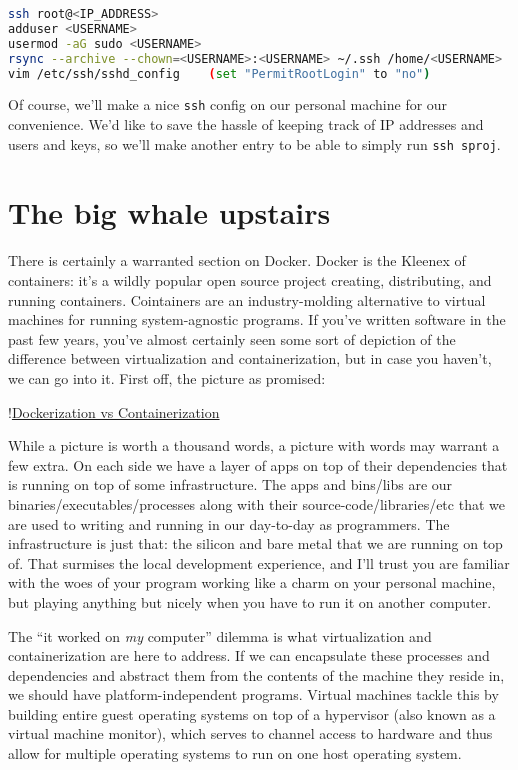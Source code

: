 \documentclass[11pt, twoside, reqno]{book}
\begin{document}
\begin{lstlisting}[language=sh]
ssh root@<IP_ADDRESS>
adduser <USERNAME>
usermod -aG sudo <USERNAME> 
rsync --archive --chown=<USERNAME>:<USERNAME> ~/.ssh /home/<USERNAME> 
vim /etc/ssh/sshd_config    (set "PermitRootLogin" to "no")
\end{lstlisting}

Of course, we'll make a nice \texttt{ssh} config on our personal machine for our convenience. We'd like to save the hassle of keeping track of IP addresses and users and keys, so we'll make another entry to be able to simply run \texttt{ssh sproj}.

\section{The big whale upstairs}

There is certainly a warranted section on Docker. Docker is the Kleenex of containers: it's a wildly popular open source project creating, distributing, and running containers. Cointainers are an industry-molding alternative to virtual machines for running system-agnostic programs. If you've written software in the past few years, you've almost certainly seen some sort of depiction of the difference between virtualization and containerization, but in case you haven't, we can go into it. First off, the picture as promised:

!\href{https://blog.netapp.com/wp-content/uploads/2016/03/Screen-Shot-2018-03-20-at-9.24.09-AM-1024x548.png}{Dockerization vs Containerization}

While a picture is worth a thousand words, a picture with words may warrant a few extra. On each side we have a layer of apps on top of their dependencies that is running on top of some infrastructure. The apps and bins/libs are our binaries/executables/processes along with their source-code/libraries/etc that we are used to writing and running in our day-to-day as programmers. The infrastructure is just that: the silicon and bare metal that we are running on top of. That surmises the local development experience, and I'll trust you are familiar with the woes of your program working like a charm on your personal machine, but playing anything but nicely when you have to run it on another computer.

The ``it worked on \textit{my} computer'' dilemma is what virtualization and containerization are here to address. If we can encapsulate these processes and dependencies and abstract them from the contents of the machine they reside in, we should have platform-independent programs. Virtual machines tackle this by building entire guest operating systems on top of a hypervisor (also known as a virtual machine monitor), which serves to channel access to hardware and thus allow for multiple operating systems to run on one host operating system.
\end{document}
